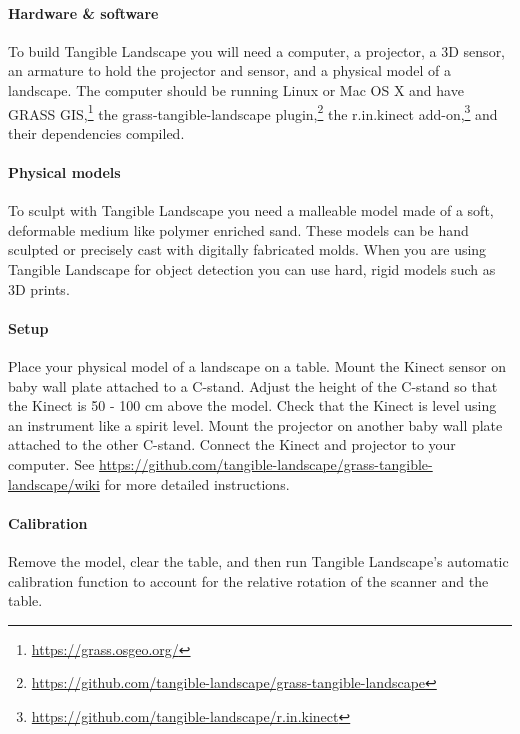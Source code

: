 \documentclass[prodmode,acmtochi]{acmsmall} %
\begin{document}
\paragraph{Hardware \& software}
To build Tangible Landscape you will need a computer,
a projector, a 3D sensor, an armature to hold the projector and sensor,
and a physical model of a landscape.
%
The computer should be
running Linux or Mac OS X and have
GRASS GIS,\footnote{
\url{https://grass.osgeo.org/}}
the grass-tangible-landscape plugin,\footnote{
\url{https://github.com/tangible-landscape/grass-tangible-landscape}}
the r.in.kinect add-on,\footnote{
\url{https://github.com/tangible-landscape/r.in.kinect}}
and their dependencies compiled. 

\paragraph{Physical models}
To sculpt with Tangible Landscape you need a malleable model 
made of a soft, deformable medium like polymer enriched sand. 
These models can be hand sculpted or precisely cast with digitally fabricated molds.
When you are using Tangible Landscape for object detection 
you can use hard, rigid models such as 3D prints. 

\paragraph{Setup}
Place your physical model of a landscape on a table. 
Mount the Kinect sensor on baby wall plate attached to a C-stand. 
Adjust the height of the C-stand so that the Kinect is 50 - 100 cm above the model. 
Check that the Kinect is level using an instrument like a spirit level.
Mount the projector on another baby wall plate attached to the other C-stand. 
Connect the Kinect and projector to your computer. 
See \url{https://github.com/tangible-landscape/grass-tangible-landscape/wiki}
for more detailed instructions.


\paragraph{Calibration}
Remove the model, clear the table, and then
run Tangible Landscape's automatic calibration function
to account for the relative rotation of the scanner and the table.
\end{document}
